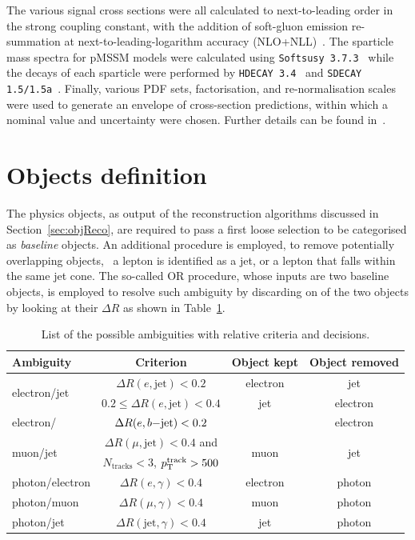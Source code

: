 			The various signal cross sections were all calculated to next-to-leading order in the strong coupling constant, with the addition of soft-gluon emission re-summation at next-to-leading-logarithm accuracy (NLO+NLL)~\cite{Beenakker:1997ut, Beenakker:2010nq, Beenakker:2011fu}. The sparticle mass spectra for \ac{pMSSM} models were calculated using \texttt{Softsusy 3.7.3}~\cite{Allanach:2001kg, Allanach:2013kza} while the decays of each sparticle were performed by \texttt{HDECAY 3.4}~\cite{hdecay} and \texttt{SDECAY 1.5/1.5a}~\cite{sdecay}. Finally, various \ac{PDF} sets, factorisation, and re-normalisation scales were used to generate an envelope of cross-section predictions, within which a nominal value and uncertainty were chosen. Further details can be found in~\cite{Borschensky:2014cia}.


	\section{Objects definition}
	\label{sec:obj_def}
			
		The physics objects, as output of the reconstruction algorithms discussed in Section~\ref{sec:objReco}, are required to pass a first loose selection to be categorised as \emph{baseline} objects. An additional procedure is employed, to remove potentially overlapping objects, \eg\ a lepton is identified as a jet, or a lepton that falls within the same jet cone. The so-called \ac{OR} procedure, whose inputs are two baseline objects, is employed to resolve such ambiguity by discarding on of the two objects by looking at their $\Delta R$ as shown in Table~\ref{tab:OR}. 

		\begin{table}[!htb]\centering\caption{List of the possible ambiguities with relative criteria and decisions.}
		\renewcommand{\arraystretch}{1.3}
			\begin{tabular}{lccc}
				\toprule 
				\textbf{Ambiguity} & \textbf{Criterion} & \textbf{Object kept} & \textbf{Object removed}\\
				\toprule
				\multirow{2}{*}{electron/jet} & $\Delta R (e,\mathrm{jet}) < 0.2$ & electron & jet\\
				& $0.2 \leq \Delta R (e,\mathrm{jet}) < 0.4$ & jet & electron \\\midrule
				electron/\bj & $\Delta R (e,b\mathrm{-jet}) < 0.2$ & \bj\ & electron\\ \midrule
				\multirow{2}{*}{muon/jet} & $\Delta R (\mu,\mathrm{jet}) < 0.4$ and & \multirow{2}{*}{muon} & \multirow{2}{*}{jet} \\ 
						& $N_{\mathrm{tracks}} < 3$, $p_{\mathrm{T}}^{\mathrm{track}} > 500$ \MeV &  &  \\ \midrule
				photon/electron & $\Delta R (e,\gamma) < 0.4$ & electron & photon\\ 
				photon/muon & $\Delta R (\mu,\gamma) < 0.4$ & muon & photon\\ 
				photon/jet & $\Delta R (\mathrm{jet}, \gamma) < 0.4$ & jet & photon\\ 
				\bottomrule
				\end{tabular}
				\label{tab:OR}
		\end{table}

